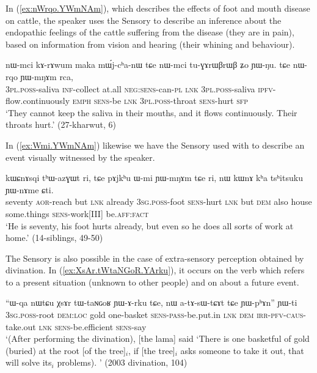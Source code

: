 In (\ref{ex:nWrqo.YWmNAm}), which describes the effects of foot and mouth disease on cattle, the speaker uses the Sensory to describe an inference about the endopathic feelings of the cattle suffering from the disease (they are in pain), based on information from vision and hearing (their whining and behaviour).

\begin{exe}
\ex \label{ex:nWrqo.YWmNAm}
\gll nɯ-mci kɤ-rɤwum maka mɯ́j-cʰa-nɯ tɕe nɯ-mci tu-ɣɤrɯβrɯβ ʑo ɲɯ-ŋu. tɕe nɯ-rqo ɲɯ-mŋɤm rca, \\
\textsc{3pl}.\textsc{poss}-saliva \textsc{inf}-collect at.all \textsc{neg}:\textsc{sens}-can-\textsc{pl} \textsc{lnk} \textsc{3pl}.\textsc{poss}-saliva \textsc{ipfv}-flow.continuously \textsc{emph} \textsc{sens}-be \textsc{lnk} \textsc{3pl}.\textsc{poss}-throat \textsc{sens}-hurt \textsc{sfp} \\
\glt `They cannot keep the saliva in their mouths, and it flows continuously. Their throats hurt.' (27-kharwut, 6)
\end{exe}

In (\ref{ex:Wmi.YWmNAm}) likewise we have the Sensory used with  to describe an event visually witnessed by the speaker.

\begin{exe}
\ex \label{ex:Wmi.YWmNAm}
\gll kɯɕnɤsqi tʰɯ-azɣɯt ri, tɕe pɤjkʰu ɯ-mi ɲɯ-mŋɤm tɕe ri, nɯ kɯnɤ kʰa tsʰitsuku ɲɯ-nɤme ɕti. \\
seventy \textsc{aor}-reach but \textsc{lnk} already \textsc{3sg}.\textsc{poss}-foot \textsc{sens}-hurt \textsc{lnk} but \textsc{dem} also house some.things \textsc{sens}-work[III] be.\textsc{aff}:\textsc{fact} \\
\glt `He is seventy, his foot hurts already, but even so he does all sorts of work at home.' (14-siblings, 49-50)
\end{exe}
 
The Sensory is also possible in the case of extra-sensory perception obtained by divination. In (\ref{ex:XsAr.tWtaNGoR.YArku}), it occurs on the verb  which refers to a present situation (unknown to other people) and on  about a future event.
 
\begin{exe}
\ex \label{ex:XsAr.tWtaNGoR.YArku}
\gll ``ɯ-qa nɯtɕu χsɤr tɯ-taɴɢoʁ ɲɯ-ɤ-rku tɕe, nɯ a-tɤ-sɯ-tɕɤt tɕe ɲɯ-pʰɤn'' ɲɯ-ti \\
\textsc{3sg}.\textsc{poss}-root \textsc{dem}:\textsc{loc} gold one-basket \textsc{sens}-\textsc{pass}-be.put.in \textsc{lnk} \textsc{dem} \textsc{irr}-\textsc{pfv}-\textsc{caus}-take.out \textsc{lnk} \textsc{sens}-be.efficient \textsc{sens}-say \\
\glt `(After performing the divination), [the lama] said `There is one basketful of gold (buried) at the root [of the tree]$_i$, if [the tree]$_i$ asks someone to take it out, that will solve its$_i$ problems). ' (2003 divination, 104)
\end{exe}

